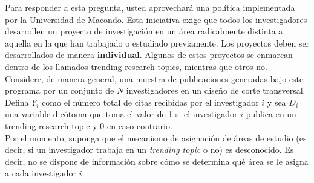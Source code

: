 \documentclass[a4paper, answers, addpoints, 11pt]{exam}
\begin{document}
Para responder a esta pregunta, usted aprovechará una política implementada por la Universidad de Macondo. Esta iniciativa exige que todos los investigadores desarrollen un proyecto de investigación en un área radicalmente distinta a aquella en la que han trabajado o estudiado previamente. Los proyectos deben ser desarrollados de manera \textbf{individual}. Algunos de estos proyectos se enmarcan dentro de los llamados trending research topics, mientras que otros no. \\

Considere, de manera general, una muestra de publicaciones generadas bajo este programa por un conjunto de $N$ investigadores en un diseño de corte transversal. Defina $Y_i$ como el número total de citas recibidas por el investigador $i$ y sea $D_i$ una variable dicótoma que toma el valor de 1 si el investigador $i$ publica en un trending research topic y 0 en caso contrario. \\

Por el momento, suponga que el mecanismo de asignación de áreas de estudio (es decir, si un investigador trabaja en un \textit{trending topic} o no) es desconocido. Es decir, no se dispone de información sobre cómo se determina qué área se le asigna a cada investigador $i$.
\end{document}
